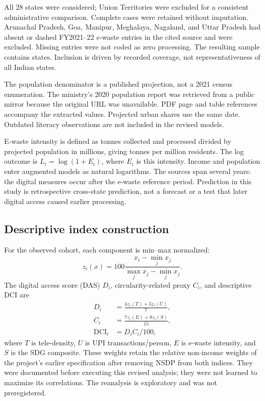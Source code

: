 \documentclass[11pt,a4paper]{article}
\begin{document}
All 28 states were considered; Union Territories were excluded for a consistent administrative comparison. Complete cases were retained without imputation. Arunachal Pradesh, Goa, Manipur, Meghalaya, Nagaland, and Uttar Pradesh had absent or dashed FY2021--22 e-waste entries in the cited source and were excluded. Missing entries were not coded as zero processing. The resulting sample contains \SampleN{} states. Inclusion is driven by recorded coverage, not representativeness of all Indian states.

The population denominator is a published projection, not a 2021 census enumeration. The ministry's 2020 population report was retrieved from a public mirror because the original URL was unavailable. PDF page and table references accompany the extracted values. Projected urban shares use the same date. Outdated literacy observations are not included in the revised models.

E-waste intensity is defined as tonnes collected and processed divided by projected population in millions, giving tonnes per million residents. The log outcome is $L_i=\log(1+E_i)$, where $E_i$ is this intensity. Income and population enter augmented models as natural logarithms. The sources span several years: the digital measures occur after the e-waste reference period. Prediction in this study is retrospective cross-state prediction, not a forecast or a test that later digital access caused earlier processing.

\subsection{Descriptive index construction}
For the observed cohort, each component is min--max normalized:
\begin{equation}
z_i(x)=100\frac{x_i-\min_j x_j}{\max_j x_j-\min_j x_j}.
\end{equation}
The digital access score (DAS) $D_i$, circularity-related proxy $C_i$, and descriptive DCI are
\begin{align}
D_i &= \frac{4z_i(T)+3z_i(U)}{7},\\
C_i &= \frac{7z_i(E)+8z_i(S)}{15},\\
\mathrm{DCI}_i &= D_iC_i/100,
\end{align}
where $T$ is tele-density, $U$ is UPI transactions/person, $E$ is e-waste intensity, and $S$ is the SDG composite. These weights retain the relative non-income weights of the project's earlier specification after removing NSDP from both indices. They were documented before executing this revised analysis; they were not learned to maximize its correlations. The reanalysis is exploratory and was not preregistered.
\end{document}
